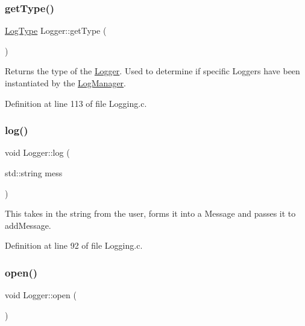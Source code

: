 \subsubsection{\texorpdfstring{getType()}{getType()}}
{\footnotesize\ttfamily \mbox{\hyperlink{namespace_world_architect_adf13e54f2c38346ed9d5013cff07fc8e}{Log\+Type}} Logger\+::get\+Type (\begin{DoxyParamCaption}{ }\end{DoxyParamCaption})}



Returns the type of the \mbox{\hyperlink{class_world_architect_1_1_logger}{Logger}}. Used to determine if specific Loggers have been instantiated by the \mbox{\hyperlink{class_world_architect_1_1_log_manager}{Log\+Manager}}. 



Definition at line 113 of file Logging.\+c.

\mbox{\label{class_world_architect_1_1_logger_a64e7c69902bcf71209f43b2c67d6a169}} 
\subsubsection{\texorpdfstring{log()}{log()}}
{\footnotesize\ttfamily void Logger\+::log (\begin{DoxyParamCaption}\item[{std\+::string}]{mess }\end{DoxyParamCaption})}



This takes in the string from the user, forms it into a Message and passes it to add\+Message. 



Definition at line 92 of file Logging.\+c.

\mbox{\label{class_world_architect_1_1_logger_a751cd1a942f2bfce73ec61feaa439d22}} 
\subsubsection{\texorpdfstring{open()}{open()}}
{\footnotesize\ttfamily void Logger\+::open (\begin{DoxyParamCaption}{ }\end{DoxyParamCaption})}



